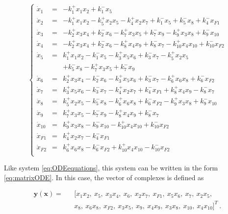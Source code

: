 	\begin{equation} \label{eq:ODEequationsExp}
		\left\lbrace\begin{array}{lll}
			\dot{x}_1 &=& - k_1^+ x_1 x_2 + k_1^- x_5    \\
			\dot{x}_2 &=& - k_1^+ x_1 x_2 - k_5^+ x_2 x_5 - k_4^+ x_2 x_7 + k_1^- x_5 + k_{5}^- x_8 + k_4^- x_{F1}  \\
			\dot{x}_3 &=& - k_2^+ x_3 x_4 + k_2^- x_6 - k_{7}^+ x_3 x_5 + k_{7}^- x_{9} - k_{9}^+ x_3 x_8 + k_{9}^- x_{10}  \\
			\dot{x}_4 &=& - k_2^+ x_3 x_4 + k_2^- x_6 - k_{8}^+ x_4 x_9 + k_{8}^- x_{7} - k_{10}^+ x_4 x_{10} + k_{10}^- x_{F2}  \\
			\dot{x}_5 &=& 	k_1^+ x_1 x_2 - k_1^- x_5 - k_3^+ x_5 x_6 + k_3^- x_7 - k_5^+ x_2 x_5 \\
			 &  & + k_{5}^- x_8 - k_{7}^+ x_3 x_5 + k_{7}^- x_{9}  \\
			\dot{x}_6 &=&   k_2^+ x_3 x_4 - k_2^- x_6 - k_3^+ x_5 x_6 + k_3^- x_7 - k_{6}^+ x_6 x_8 + k_{6}^- x_{F2}  \\
			\dot{x}_7 &=& 	k_3^+ x_5 x_6 - k_3^- x_7 - k_4^+ x_2 x_7 + k_4^- x_{F1} + k_{8}^+ x_4 x_9 - k_{8}^- x_{7}   \\
			\dot{x}_8 &=& 	k_5^+ x_2 x_5 - k_{5}^- x_8 - k_{6}^+ x_6 x_8 + k_{6}^- x_{F2} - k_{9}^+ x_3 x_8 + k_{9}^- x_{10} \\
			\dot{x}_9 &=& 	k_{7}^+ x_3 x_5 - k_{7}^- x_{9} - k_{8}^+ x_4 x_{9} + k_{8}^- x_{7}   \\
			\dot{x}_{10} &=& k_{9}^+ x_3 x_8 - k_{9}^- x_{10} - k_{10}^+ x_4 x_{10} + k_{10}^- x_{F2}   \\
			\dot{x}_{F1} &=& k_4^+ x_2 x_7 - k_4^- x_{F1}  \\
			\dot{x}_{F2} &=& k_{6}^+ x_6 x_8 - k_{6}^- x_{F2} + k_{10}^+ x_4 x_{10} - k_{10}^- x_{F2} \\
		\end{array}
		\right.
	\end{equation}

	Like system \eqref{eq:ODEequations}, this system can be written in
	the form \eqref{eq:matrixODE}.  In this case, the vector of
	complexes is defined as
		
	\begin{eqnarray}
		\mathbf{y(x)} = &&[x_1 x_2,~x_5,~x_3 x_4,~x_6,~x_2 x_7,~ x_{F1},~ x_5
		x_6,~ x_7,~ x_2 x_5, \nonumber \\
		&& x_8,~ x_6 x_8,~ x_{F2},~ x_3 x_5,~ x_{9},~ x_4 x_{9},~ x_3
		x_8,~ x_{10},~ x_4 x_{10}]^T~. \label{eq:yExp}
	\end{eqnarray}

